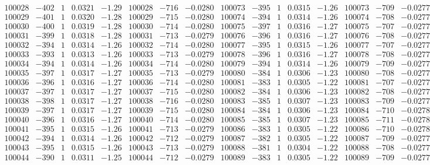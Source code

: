 \documentclass[11pt,reqno,a4letter]{article}
\numberwithin{figure}{section}
\numberwithin{table}{section}
\theoremstyle{plain}
\numberwithin{theorem}{section}
\theoremstyle{definition}
\begin{document}
\begin{table}[ht!]
\begin{equation*}
{\begin{array}{ccccc|ccc||ccccc|ccc}
100028 & -402 & 1 & 0.0321 & -1.29 & 100028 & -716 & -0.0280 & 100073 & -395 & 1 & 0.0315 & -1.26 & 100073 & -709 & -0.0277  \\
100029 & -401 & 1 & 0.0320 & -1.28 & 100029 & -715 & -0.0280 & 100074 & -394 & 1 & 0.0314 & -1.26 & 100074 & -708 & -0.0277  \\
100030 & -400 & 1 & 0.0319 & -1.28 & 100030 & -714 & -0.0280 & 100075 & -397 & 1 & 0.0316 & -1.27 & 100075 & -707 & -0.0277  \\
100031 & -399 & 1 & 0.0318 & -1.28 & 100031 & -713 & -0.0279 & 100076 & -396 & 1 & 0.0316 & -1.27 & 100076 & -708 & -0.0277  \\
100032 & -394 & 1 & 0.0314 & -1.26 & 100032 & -714 & -0.0280 & 100077 & -395 & 1 & 0.0315 & -1.26 & 100077 & -707 & -0.0277  \\
100033 & -393 & 1 & 0.0313 & -1.26 & 100033 & -713 & -0.0279 & 100078 & -396 & 1 & 0.0316 & -1.27 & 100078 & -708 & -0.0277  \\
100034 & -394 & 1 & 0.0314 & -1.26 & 100034 & -714 & -0.0280 & 100079 & -394 & 1 & 0.0314 & -1.26 & 100079 & -709 & -0.0277  \\
100035 & -397 & 1 & 0.0317 & -1.27 & 100035 & -713 & -0.0279 & 100080 & -384 & 1 & 0.0306 & -1.23 & 100080 & -708 & -0.0277  \\
100036 & -396 & 1 & 0.0316 & -1.27 & 100036 & -714 & -0.0280 & 100081 & -383 & 1 & 0.0305 & -1.22 & 100081 & -707 & -0.0277  \\
100037 & -397 & 1 & 0.0317 & -1.27 & 100037 & -715 & -0.0280 & 100082 & -384 & 1 & 0.0306 & -1.23 & 100082 & -708 & -0.0277  \\
100038 & -398 & 1 & 0.0317 & -1.27 & 100038 & -716 & -0.0280 & 100083 & -385 & 1 & 0.0307 & -1.23 & 100083 & -709 & -0.0277  \\
100039 & -397 & 1 & 0.0317 & -1.27 & 100039 & -715 & -0.0280 & 100084 & -384 & 1 & 0.0306 & -1.23 & 100084 & -710 & -0.0278  \\
100040 & -396 & 1 & 0.0316 & -1.27 & 100040 & -714 & -0.0280 & 100085 & -385 & 1 & 0.0307 & -1.23 & 100085 & -711 & -0.0278  \\
100041 & -395 & 1 & 0.0315 & -1.26 & 100041 & -713 & -0.0279 & 100086 & -383 & 1 & 0.0305 & -1.22 & 100086 & -710 & -0.0278  \\
100042 & -394 & 1 & 0.0314 & -1.26 & 100042 & -712 & -0.0279 & 100087 & -382 & 1 & 0.0305 & -1.22 & 100087 & -709 & -0.0277  \\
100043 & -395 & 1 & 0.0315 & -1.26 & 100043 & -713 & -0.0279 & 100088 & -381 & 1 & 0.0304 & -1.22 & 100088 & -708 & -0.0277  \\
100044 & -390 & 1 & 0.0311 & -1.25 & 100044 & -712 & -0.0279 & 100089 & -383 & 1 & 0.0305 & -1.22 & 100089 & -709 & -0.0277  \\
\end{array}
}
\end{equation*} 


\end{table}
\end{document}
